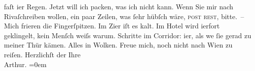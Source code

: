\begin{ledgroupsized}[t]{13cm}
                    faſt i{\geminationm}er Regen. {\pb}Jetzt
                    will ich packen, was ich nicht kann.\pend
           \pstart
           Wenn Sie mir nach Rivaſchreiben wollen, ein paar Zeilen, was ſehr
                    hübſch wäre, \textsc{post rest}, bitte. –\pend
           \pstart
           Mich frieren die Fingerſpitzen. Im Zi{\geminationm}er iſt es
                    kalt. Im Hotel wird i{\geminationm}erfort geklingelt, kein
                    Menſch weiſs warum. Schritte im Corridor: i{\geminationm}er, als
                        we{\geminationn}{ }ſie gerad zu meiner Thür kämen. Alles in
                    Wolken. {\pb}Freue mich, noch nicht nach Wien zu reiſen.\pend
           \pstart
           Herzlichſt der Ihre{\\[\baselineskip]}\spacefill\mbox{Arthur.}\pend
           \leftskip=0em{}
         
         \endnumbering{}\end{ledgroupsized}  \newcommand{\dateiname}{L00122}\newcommand{\titel}{Arthur Schnitzler an Hugo von Hofmannsthal, 11. 9. 1892}\newcommand{\editorInnen}{Martin Anton Müller und Gerd-Hermann Susen}
      